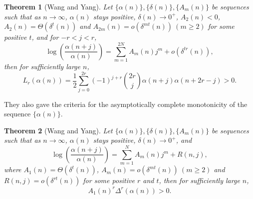 \documentclass[12pt]{article}
\newtheorem{thm}{Theorem}[section]
\numberwithin{equation}{section}
\begin{document}
\begin{thm}[Wang and Yang]\label{theowy4}
Let $\{\alpha(n)\},\{\delta(n)\},\{A_m(n)\}$ be sequences such that as $n\rightarrow\infty$, $\alpha(n)$ stays positive, $\delta(n)\rightarrow 0^+$, $A_2(n)<0$, $A_2(n)=\Theta(\delta^{t}(n))$ and $A_{2m}(n)=o(\delta^{mt}(n))\ (m\geq2)$ for some positive $t$, and for $-r<j<r$,
\begin{equation*}
\log\left(\frac{\alpha(n+j)}{\alpha(n)}\right)
=\sum_{m=1}^{2N}A_m(n)j^m+o\left(\delta^{tr}(n)\right),
\end{equation*}
then for sufficiently large $n$,
\begin{equation*}
L_r(\alpha(n))=\frac{1}{2}\sum_{j=0}^{2r}(-1)^{j+r}{2r\choose j}\alpha(n+j)\alpha(n+2r-j)>0.
\end{equation*}
\end{thm}
They also gave the criteria for the
asymptotically complete monotonicity of the sequence $\{\alpha(n)\}$.
\begin{thm}[Wang and Yang]\label{thm:wy-d}
Let $\{\alpha(n)\},\{\delta(n)\},\{A_m(n)\}$ be sequences such that as $n\rightarrow\infty$, $\alpha(n)$ stays positive, $\delta(n)\rightarrow 0^+$, and
\begin{equation*}
\log\left(\frac{\alpha(n+j)}{\alpha(n)}\right)
=\sum_{m=1}^{N}A_m(n)j^m
+R(n,j),
\end{equation*}
where $A_1(n)=\Theta(\delta^{t}(n))$, $A_{m}(n)=o(\delta^{mt}(n))\ (m\geq2)$ and $R(n,j)=o\left(\delta^{rt}(n)\right)$ for some positive $r$ and $t$, then for sufficiently large $n$,
\begin{equation*}
A_1(n)^r\Delta^r\left(\alpha(n)\right)>0.
\end{equation*}
\end{thm}

%
\end{document}
